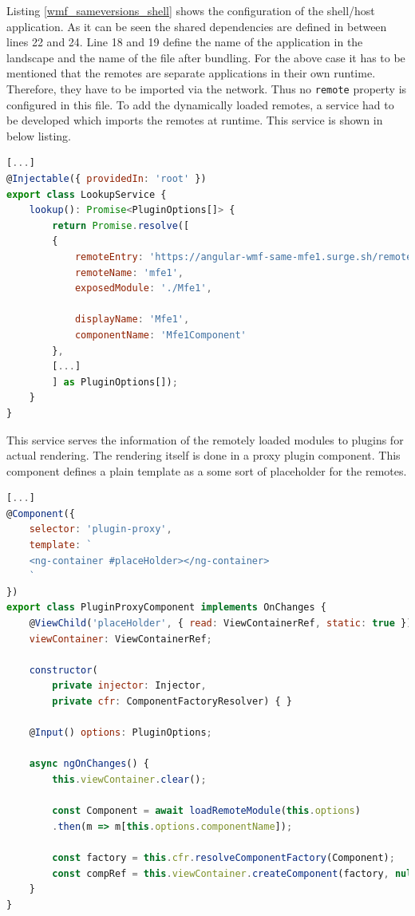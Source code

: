 Listing \ref{wmf_sameversions_shell} shows the configuration of the shell/host application. As it can be seen the shared dependencies are defined in between lines 22 and 24. Line 18 and 19 define the name of the application in the landscape and the name of the file after bundling. For the above case it has to be mentioned that the remotes are separate applications in their own runtime. Therefore, they have to be imported via the network. Thus no \texttt{remote} property is configured in this file. To add the dynamically loaded remotes, a service had to be developed which imports the remotes at runtime. This service is shown in below listing.\cite{wmf_angular_dynamicfederation}

\begin{lstlisting}[language=JavaScript, caption=Content of \texttt{lookup.service.ts} for remote module loading in shell applications, label=wmf_lookup_service]
[...]
@Injectable({ providedIn: 'root' })
export class LookupService {
	lookup(): Promise<PluginOptions[]> {
		return Promise.resolve([
		{
			remoteEntry: 'https://angular-wmf-same-mfe1.surge.sh/remoteEntry.js',
			remoteName: 'mfe1',
			exposedModule: './Mfe1',
			
			displayName: 'Mfe1',
			componentName: 'Mfe1Component'
		},
		[...]	
		] as PluginOptions[]);
	}
}
\end{lstlisting}

This service serves the information of the remotely loaded modules to plugins for actual rendering. The rendering itself is done in a proxy plugin component. This component defines a plain template as a some sort of placeholder for the remotes. \cite{wmf_angular_dynamicfederation}
\newpage
\begin{lstlisting}[language=JavaScript, caption=Content of \texttt{plugin-proxy.component.ts} for remote module loading in shell applications, label=wmf_pluginproxy]
[...]	
@Component({
	selector: 'plugin-proxy',
	template: `
	<ng-container #placeHolder></ng-container>
	`
})
export class PluginProxyComponent implements OnChanges {
	@ViewChild('placeHolder', { read: ViewContainerRef, static: true })
	viewContainer: ViewContainerRef;
	
	constructor(
		private injector: Injector,
		private cfr: ComponentFactoryResolver) { }
	
	@Input() options: PluginOptions;
	
	async ngOnChanges() {
		this.viewContainer.clear();
		
		const Component = await loadRemoteModule(this.options)
		.then(m => m[this.options.componentName]);
		
		const factory = this.cfr.resolveComponentFactory(Component);
		const compRef = this.viewContainer.createComponent(factory, null, this.injector);		
	}
}
\end{lstlisting}

